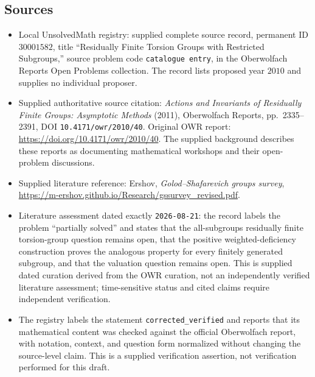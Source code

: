 \documentclass[11pt]{article}
\begin{document}
\subsection{Sources}
\begin{itemize}
\item Local UnsolvedMath registry: supplied complete source record, permanent ID \(30001582\), title ``Residually Finite Torsion Groups with Restricted Subgroups,'' source problem code \texttt{catalogue entry}, in the Oberwolfach Reports Open Problems collection. The record lists proposed year \(2010\) and supplies no individual proposer.
\item Supplied authoritative source citation: \emph{Actions and Invariants of Residually Finite Groups: Asymptotic Methods} (2011), Oberwolfach Reports, pp.\ 2335--2391, DOI \texttt{10.4171/owr/2010/40}. Original OWR report: \url{https://doi.org/10.4171/owr/2010/40}. The supplied background describes these reports as documenting mathematical workshops and their open-problem discussions.
\item Supplied literature reference: Ershov, \emph{Golod--Shafarevich groups survey}, \url{https://m-ershov.github.io/Research/gssurvey_revised.pdf}.
\item Literature assessment dated exactly \texttt{2026-08-21}: the record labels the problem ``partially solved'' and states that the all-subgroups residually finite torsion-group question remains open, that the positive weighted-deficiency construction proves the analogous property for every finitely generated subgroup, and that the valuation question remains open. This is supplied dated curation derived from the OWR curation, not an independently verified literature assessment; time-sensitive status and cited claims require independent verification.
\item The registry labels the statement \texttt{corrected\_verified} and reports that its mathematical content was checked against the official Oberwolfach report, with notation, context, and question form normalized without changing the source-level claim. This is a supplied verification assertion, not verification performed for this draft.
\end{itemize}
\end{document}
